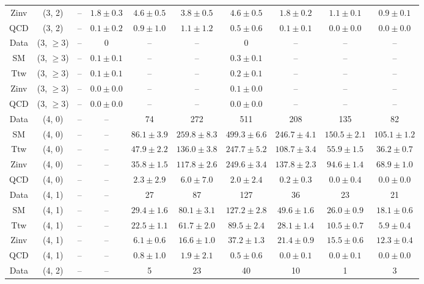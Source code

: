 \begin{table}[h!]
{\begin{tabular}{cccccccccc}
	Zinv & (3, 2) & -- & $1.8\pm 0.3$ & $4.6\pm 0.5$ & $3.8\pm 0.5$ & $4.6\pm 0.5$ & $1.8\pm 0.2$ & $1.1\pm 0.1$ & $0.9\pm 0.1$ \\[0.5ex] 
	QCD & (3, 2) & -- & $0.1\pm 0.2$ & $0.9\pm 1.0$ & $1.1\pm 1.2$ & $0.5\pm 0.6$ & $0.1\pm 0.1$ & $0.0\pm 0.0$ & $0.0\pm 0.0$ \\[0.5ex] 
	Data & (3, $\ge3$) & -- & 0 & -- & -- & 0 & -- & -- & -- \\[0.5ex] 
	SM & (3, $\ge3$) & -- & $0.1\pm 0.1$ & -- & -- & $0.3\pm 0.1$ & -- & -- & -- \\[0.5ex] 
	Ttw & (3, $\ge3$) & -- & $0.1\pm 0.1$ & -- & -- & $0.2\pm 0.1$ & -- & -- & -- \\[0.5ex] 
	Zinv & (3, $\ge3$) & -- & $0.0\pm 0.0$ & -- & -- & $0.1\pm 0.0$ & -- & -- & -- \\[0.5ex] 
	QCD & (3, $\ge3$) & -- & $0.0\pm 0.0$ & -- & -- & $0.0\pm 0.0$ & -- & -- & -- \\[0.5ex] 
	Data & (4, 0) & -- & -- & 74 & 272 & 511 & 208 & 135 & 82 \\[0.5ex] 
	SM & (4, 0) & -- & -- & $86.1\pm 3.9$ & $259.8\pm 8.3$ & $499.3\pm 6.6$ & $246.7\pm 4.1$ & $150.5\pm 2.1$ & $105.1\pm 1.2$ \\[0.5ex] 
	Ttw & (4, 0) & -- & -- & $47.9\pm 2.2$ & $136.0\pm 3.8$ & $247.7\pm 5.2$ & $108.7\pm 3.4$ & $55.9\pm 1.5$ & $36.2\pm 0.7$ \\[0.5ex] 
	Zinv & (4, 0) & -- & -- & $35.8\pm 1.5$ & $117.8\pm 2.6$ & $249.6\pm 3.4$ & $137.8\pm 2.3$ & $94.6\pm 1.4$ & $68.9\pm 1.0$ \\[0.5ex] 
	QCD & (4, 0) & -- & -- & $2.3\pm 2.9$ & $6.0\pm 7.0$ & $2.0\pm 2.4$ & $0.2\pm 0.3$ & $0.0\pm 0.4$ & $0.0\pm 0.0$ \\[0.5ex] 
	Data & (4, 1) & -- & -- & 27 & 87 & 127 & 36 & 23 & 21 \\[0.5ex] 
	SM & (4, 1) & -- & -- & $29.4\pm 1.6$ & $80.1\pm 3.1$ & $127.2\pm 2.8$ & $49.6\pm 1.6$ & $26.0\pm 0.9$ & $18.1\pm 0.6$ \\[0.5ex] 
	Ttw & (4, 1) & -- & -- & $22.5\pm 1.1$ & $61.7\pm 2.0$ & $89.5\pm 2.4$ & $28.1\pm 1.4$ & $10.5\pm 0.7$ & $5.9\pm 0.4$ \\[0.5ex] 
	Zinv & (4, 1) & -- & -- & $6.1\pm 0.6$ & $16.6\pm 1.0$ & $37.2\pm 1.3$ & $21.4\pm 0.9$ & $15.5\pm 0.6$ & $12.3\pm 0.4$ \\[0.5ex] 
	QCD & (4, 1) & -- & -- & $0.8\pm 1.0$ & $1.9\pm 2.1$ & $0.5\pm 0.6$ & $0.0\pm 0.1$ & $0.0\pm 0.1$ & $0.0\pm 0.0$ \\[0.5ex] 
	Data & (4, 2) & -- & -- & 5 & 23 & 40 & 10 & 1 & 3 \\[0.5ex] 

\end{tabular}}
\end{table}
